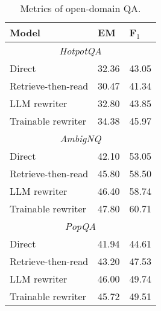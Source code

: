 \begin{table}[tbh]
	\centering\small
	{\begin{tabular}{p{4cm}p{0.9cm}p{0.9cm}}
		\toprule
		\textbf{Model} & \textbf{EM} &\textbf{F$_{1}$} \\
            \midrule
            \multicolumn{3}{c}{\emph{HotpotQA}} \\
            Direct &32.36& 43.05 \\
            Retrieve-then-read &30.47& 41.34 \\
            LLM rewriter &32.80& 43.85 \\
            Trainable rewriter &34.38& 45.97 \\
            \midrule
            \multicolumn{3}{c}{\emph{AmbigNQ}} \\
            Direct &42.10& 53.05 \\
            Retrieve-then-read &45.80 & 58.50  \\
            LLM rewriter &46.40 &58.74  \\
            Trainable rewriter &47.80 & 60.71 \\
            \midrule
            \multicolumn{3}{c}{\emph{PopQA}} \\
            Direct &41.94 & 44.61  \\
            Retrieve-then-read & 43.20 &47.53 \\
            LLM rewriter &46.00 & 49.74  \\
            Trainable rewriter &45.72& 49.51 \\
		\bottomrule
	\end{tabular}
	}
        \caption{Metrics of open-domain QA.}
	\label{mainqa}
 \vspace{-1.2em}
\end{table}

            


